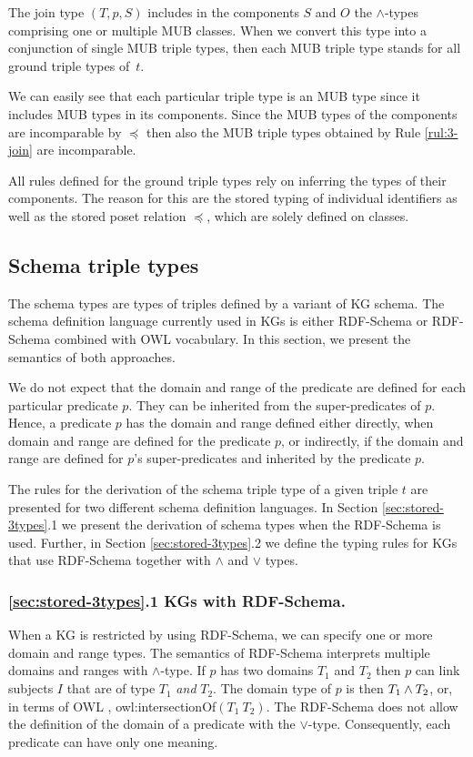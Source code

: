 \documentclass[runningheads]{llncs}
\begin{document}
The join type $(T,p,S)$ includes in the components $S$ and $O$ the
$\land$-types comprising one or multiple MUB classes. When we convert
this type into a conjunction of single MUB triple types, then each MUB
triple type stands for all ground triple types of~$t$.

We can easily see that each particular triple type is an MUB type
since it includes MUB types in its components. Since the MUB types of
the components are incomparable by $\preceq$ then also the MUB triple
types obtained by Rule \ref{rul:3-join} are incomparable.

All rules defined for the ground triple types rely on inferring the
types of their components. The reason for this are the stored typing
of individual identifiers as well as the stored poset relation
$\preceq$, which are solely defined on classes.






\subsection{Schema triple types\label{sec:stored-3types}}

The schema types are types of triples defined by a variant of KG
schema. The schema definition language currently used in KGs is either
RDF-Schema \cite{rdfschema} or RDF-Schema combined with OWL
\cite{owl2} vocabulary. In this section, we present the semantics of
both approaches.

We do not expect that the domain and range of the predicate are defined
for each particular predicate $p$. They can be inherited from the
super-predicates of $p$. Hence, a predicate $p$ has the domain and
range defined either directly, when domain and range are defined for
the predicate $p$, or indirectly, if the domain and range are defined
for $p$'s super-predicates and inherited by the predicate $p$.

The rules for the derivation of the schema triple type of a given
triple $t$ are presented for two different schema definition
languages. In Section \ref{sec:stored-3types}.1 we present the
derivation of schema types when the RDF-Schema is used. Further, in
Section \ref{sec:stored-3types}.2 we define the typing rules for
KGs that use RDF-Schema together with $\land$ and $\lor$ types.






\subsubsection{\ref{sec:stored-3types}.1 KGs with RDF-Schema.}
When a KG is restricted by using RDF-Schema, we can specify one or more
domain and range types. The semantics of RDF-Schema
\cite{rdfsemantics} interprets multiple domains and ranges with
$\land$-type. If $p$ has two domains $T_1$ and $T_2$ then $p$ can link
subjects $I$ that are of type $T_1$ \emph{and} $T_2$. The domain type
of $p$ is then $T_1\land\/T_2$, or, in terms of OWL \cite{owl},
owl:intersectionOf$(T_1\ T_2)$. The RDF-Schema does not allow the
definition of the domain of a predicate with the
$\lor$-type. Consequently, each predicate can have only one meaning.
\end{document}
